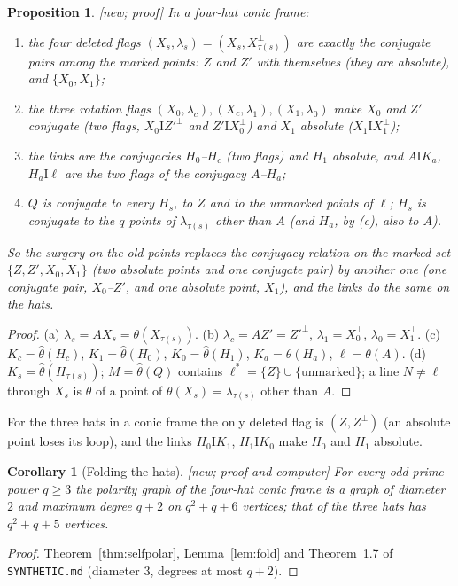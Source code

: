 \documentclass[11pt]{amsart}
\newtheorem{proposition}[theorem]{Proposition}
\newtheorem{corollary}[theorem]{Corollary}
\theoremstyle{definition}
\theoremstyle{remark}
\newcommand{\I}{\mathrel{\mathrm{I}}}
\newcommand{\lam}{\lambda}
\newcommand{\status}[1]{\textup{[#1]}}
\begin{document}
\begin{proposition}\label{prop:gadget}
\status{new; proof} In a four-hat conic frame:
\begin{enumerate}[label=(\alph*)]
\item the four deleted flags $(X_s,\lam_s)=(X_s,X_{\tau(s)}^\perp)$ are exactly the conjugate pairs among the
marked points: $Z$ and $Z'$ with themselves (they are absolute), and $\{X_0,X_1\}$;
\item the three rotation flags $(X_0,\lam_c),(X_c,\lam_1),(X_1,\lam_0)$ make $X_0$ and $Z'$ conjugate (two flags,
$X_0\I Z'^\perp$ and $Z'\I X_0^\perp$) and $X_1$ absolute ($X_1\I X_1^\perp$);
\item the links are the conjugacies $H_0$--$H_c$ (two flags) and $H_1$ absolute, and $A\I K_a$, $H_a\I\ell$ are
the two flags of the conjugacy $A$--$H_a$;
\item $Q$ is conjugate to every $H_s$, to $Z$ and to the unmarked points of $\ell$; $H_s$ is conjugate to the $q$
points of $\lam_{\tau(s)}$ other than $A$ (and $H_a$, by (c), also to $A$).
\end{enumerate}
So the surgery on the old points replaces the conjugacy relation on the marked set
$\{Z,Z',X_0,X_1\}$ (two absolute points and one conjugate pair) by another one (one conjugate pair, $X_0$--$Z'$, and
one absolute point, $X_1$), and the links do the same on the hats.
\end{proposition}
\begin{proof}
(a) $\lam_s=AX_s=\theta(X_{\tau(s)})$. (b) $\lam_c=AZ'=Z'^\perp$, $\lam_1=X_0^\perp$, $\lam_0=X_1^\perp$.
(c) $K_c=\hat\theta(H_c)$, $K_1=\hat\theta(H_0)$, $K_0=\hat\theta(H_1)$, $K_a=\hat\theta(H_a)$, $\ell=\theta(A)$.
(d) $K_s=\hat\theta(H_{\tau(s)})$; $M=\hat\theta(Q)$ contains $\ell^*=\{Z\}\cup\{\text{unmarked}\}$; a line $N\ne\ell$
through $X_s$ is $\theta$ of a point of $\theta(X_s)=\lam_{\tau(s)}$ other than $A$.
\end{proof}

For the three hats in a conic frame the only deleted flag is $(Z,Z^\perp)$ (an absolute point loses its loop),
and the links $H_0\I K_1$, $H_1\I K_0$ make $H_0$ and $H_1$ absolute.

\begin{corollary}[Folding the hats]\label{cor:fold}
\status{new; proof and computer} For every odd prime power $q\ge3$ the polarity graph of the four-hat conic frame is a
graph of diameter $2$ and maximum degree $q+2$ on $q^2+q+6$ vertices; that of the three hats has $q^2+q+5$ vertices.
\end{corollary}
\begin{proof}
Theorem~\ref{thm:selfpolar}, Lemma~\ref{lem:fold} and Theorem~1.7 of \texttt{SYNTHETIC.md} (diameter $3$, degrees
at most $q+2$).
\end{proof}
\end{document}
